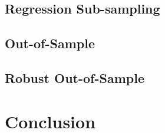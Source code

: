 \documentclass[mnsc,blindrev]{informs3} %
\begin{document}
%



%
\subsection{Regression Sub-sampling}\label{sec:subsampling}
%


\subsection{Out-of-Sample} \label{sec:out_sample}



\subsection{Robust Out-of-Sample}




\section{Conclusion}



%
%
%
%
%
\end{document}
